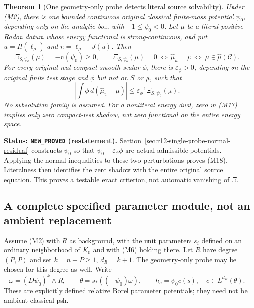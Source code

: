 \documentclass[11pt,a4paper]{article}
\numberwithin{equation}{section}
\newtheorem{theorem}{Theorem}[section]
\theoremstyle{definition}
\theoremstyle{remark}
\begin{document}
\begin{theorem}[One geometry-only probe detects literal source solvability]
\label{thm:r12-main-single-normal-probe}
Under (M2), there is one bounded continuous original classical
finite-mass potential $\psi_0$, depending only on the analytic box,
with $-1\leq\psi_0<0$. Let $\mu$ be a literal positive Radon datum
whose energy functional is strong-continuous, and put
$u=\Pi(\ell_\mu)$ and $n=\ell_\mu-J(u)$. Then
\[
 \Xi_{S,\psi_0}(\mu)=-n(\psi_0)\geq0,
 \qquad
 \Xi_{S,\psi_0}(\mu)=0
       \ \Longleftrightarrow\ \widehat\mu_u=\mu
       \ \Longleftrightarrow\ \mu\in\widehat\mu(\mathscr C).
 \tag{M17}
\]
For every original real compact smooth scalar $\phi$, there is
$\varepsilon_\phi>0$, depending on the original finite test stage
and $\phi$ but not on $S$ or $\mu$, such that
\[
 \left|\int\phi\,d(\widehat\mu_u-\mu)\right|
              \leq \varepsilon_\phi^{-1}\Xi_{S,\psi_0}(\mu).
 \tag{M18}
\]
No subsolution family is assumed. For a nonliteral energy dual,
zero in (M17) implies only zero compact-test shadow, not zero
functional on the entire energy space.
\end{theorem}

\noindent\textbf{Status: \texttt{NEW\_PROVED} (restatement).}
Section~\ref{sec:r12-single-probe-normal-residual} constructs
$\psi_0$ so that $\psi_0\pm\varepsilon_\phi\phi$ are actual
admissible potentials. Applying the normal inequalities to these
two perturbations proves (M18). Literalness then identifies the
zero shadow with the entire original source equation. This proves
a testable exact criterion, not automatic vanishing of $\Xi$.

\subsection{A complete specified parameter module, not an ambient replacement}

Assume (M2) with $R$ as background, with the unit parameters $s_i$
defined on an ordinary neighborhood of $K_0$ and with (M6) holding
there. Let $R$ have degree $(P,P)$ and set
$k=n-P\geq1$, $d_R=k+1$. The geometry-only probe may be chosen
for this degree as well. Write
\[
 \omega=(D\psi_0)^k\wedge R,\qquad
 \theta=s_*((-\psi_0)\omega),\qquad
 h_c=\psi_0 c(s),\quad c\in L^{d_R}_+(\theta).
 \tag{M19}
\]
These are explicitly defined relative Borel parameter potentials;
they need not be ambient classical psh.
\end{document}
